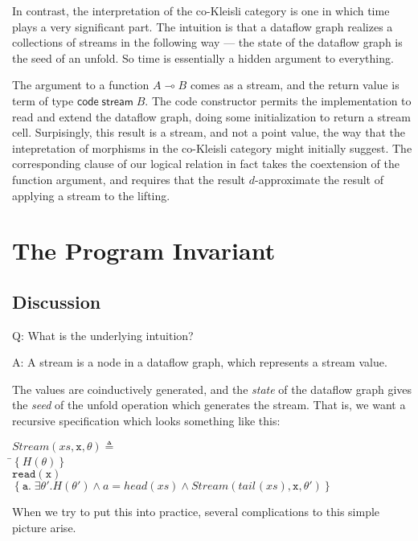 \documentclass[preprint]{sigplanconf}
\newcommand{\setof}[1]{\left\{{#1}\right\}}
\newcommand{\term}[1]{\ensuremath{\mathtt{{#1}}}}
\newcommand{\comp}[1]{\mathsf{code}\;{#1}}
\newcommand{\streamtype}[1]{\mathsf{stream}\;{#1}}
\newcommand{\lolli}{\multimap}
\newcommand{\head}[1]{\mathit{head}(#1)}
\newcommand{\tail}[2][]{\mathit{tail}^{#1}(#2)}
\begin{document}
In contrast, the interpretation of the co-Kleisli category is one in
which time plays a very significant part. The intuition is that a
dataflow graph realizes a collections of streams in the following way
--- the state of the dataflow graph is the seed of an unfold.  So time
is essentially a hidden argument to everything.

The argument to a function $A \lolli B$ comes as a stream, and the
return value is term of type $\comp{\streamtype{B}}$. The code
constructor permits the implementation to read and extend the dataflow
graph, doing some initialization to return a stream cell. Surpisingly,
this result is a stream, and not a point value, the way that the
intepretation of morphisms in the co-Kleisli category might initially
suggest. The corresponding clause of our logical relation in fact
takes the coextension of the function argument, and requires that the
result $d$-approximate the result of applying a stream to the lifting. 

\section{The Program Invariant}

\subsection{Discussion}

Q: What is the underlying intuition?

\noindent A: A stream is a node in a dataflow graph, which represents a stream value. 

The values are coinductively generated, and the \emph{state} of the
dataflow graph gives the \emph{seed} of the unfold operation which
generates the stream. That is, we want a recursive specification 
which looks something like this: 

\begin{tabbing}
$\mathit{Stream}(xs, \term{x}, \theta) \triangleq$  \\
\;\;\=$\setof{H(\theta)}$  \\
    \>\term{read(x)} \\
    \>$\setof{\term{a}.\;\exists \theta'. H(\theta') \land a = \head{xs} \land 
                           \mathit{Stream}(\tail{xs},\term{x}, \theta')}$ \\
\end{tabbing}

When we try to put this into practice, several complications to this
simple picture arise.
\end{document}
